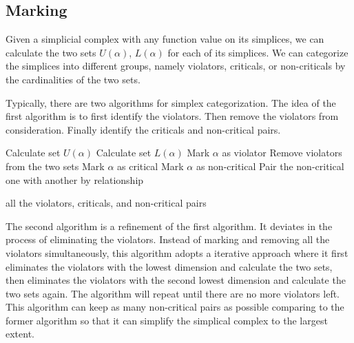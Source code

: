 \documentclass[12pt]{article}
\begin{document}
\subsection{Marking}
Given a simplicial complex with any function value on its simplices, we can calculate the two sets $U(\alpha)$, $L(\alpha)$ for each of its simplices. We can categorize the simplices into different groups, namely violators, criticals, or non-criticals by the cardinalities of the two sets.

Typically, there are two algorithms for simplex categorization. The idea of the first algorithm is to first identify the violators. Then remove the violators from consideration. Finally identify the criticals and non-critical pairs.

\begin{algorithm}
	\caption{}\label{v1}
	\begin{algorithmic}[0]
	        \State Calculate set $U(\alpha)$
	        \State Calculate set $L(\alpha)$
	    \EndFor
	        \State Mark $\alpha$ as violator
	        \EndIf
	    \EndFor
	    \State Remove violators from the two sets
	        \State Mark $\alpha$ as critical
	        \EndIf
	        \State Mark $\alpha$ as non-critical
	        \EndIf
	    \EndFor
	    \State Pair the non-critical one with another by relationship
	    
		\Return all the violators, criticals, and non-critical pairs
		\EndFunction
	\end{algorithmic}
\end{algorithm}

The second algorithm is a refinement of the first algorithm. It deviates in the process of eliminating the violators. Instead of marking and removing all the violators simultaneously, this algorithm adopts a  iterative approach where it first eliminates the violators with the lowest dimension and calculate the two sets, then eliminates the violators with the second lowest dimension and calculate the two sets again. The algorithm will repeat until there are no more violators left. This algorithm can keep as many non-critical pairs as possible comparing to the former algorithm so that it can simplify the simplical complex to the largest extent.

\newpage
\end{document}
